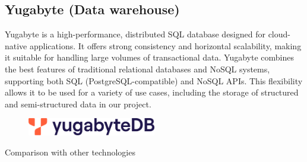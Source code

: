 \documentclass[12pt,a4paper]{article}
\begin{document}
\subsection{Yugabyte (Data warehouse)}
Yugabyte is a high-performance, distributed SQL database designed for cloud-native applications. It offers strong consistency and horizontal scalability, making it suitable for handling large volumes of transactional data. Yugabyte combines the best features of traditional relational databases and NoSQL systems, supporting both SQL (PostgreSQL-compatible) and NoSQL APIs. This flexibility allows it to be used for a variety of use cases, including the storage of structured and semi-structured data in our project.
\begin{figure}[H]
    \begin{center}
        \includegraphics[width=0.5\textwidth]{Images/yugabyte.png}
    \end{center}
\end{figure}
Comparison with other technologies
\end{document}
